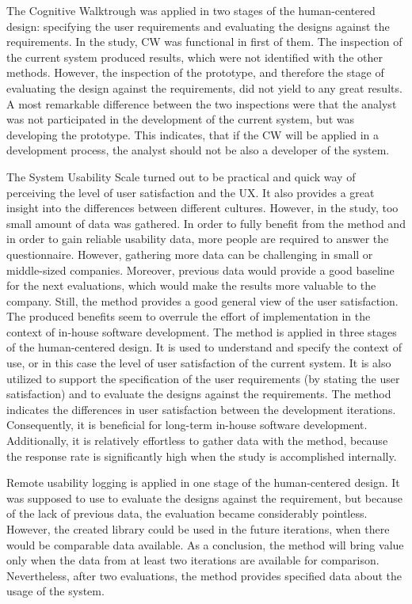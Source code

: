\documentclass[12pt,a4paper,oneside,pdftex]{report}
\begin{document}
The Cognitive Walktrough was applied in two stages of the human-centered design: specifying the user requirements and evaluating the designs against the requirements. In the study, CW was functional in first of them. The inspection of the current system produced results, which were not identified with the other methods. However, the inspection of the prototype, and therefore the stage of evaluating the design against the requirements, did not yield to any great results. A most remarkable difference between the two inspections were that the analyst was not participated in the development of the current system, but was developing the prototype. This indicates, that if the CW will be applied in a development process, the analyst should not be also a developer of the system.  

The System Usability Scale turned out to be practical and quick way of perceiving the level of user satisfaction and the UX. It also provides a great insight into the differences between different cultures. However, in the study, too small amount of data was gathered. In order to fully benefit from the method and in order to gain reliable usability data, more people are required to answer the questionnaire. However, gathering more data can be challenging in small or middle-sized companies. Moreover, previous data would provide a good baseline for the next evaluations, which would make the results more valuable to the company. Still, the method provides a good general view of the user satisfaction. The produced benefits seem to overrule the effort of implementation in the context of in-house software development. The method is applied in three stages of the human-centered design. It is used to understand and specify the context of use, or in this case the level of user satisfaction of the current system. It is also utilized to support the specification of the user requirements (by stating the user satisfaction) and to evaluate the designs against the requirements. The method indicates the differences in user satisfaction between the development iterations. Consequently, it is beneficial for long-term in-house software development. Additionally, it is relatively effortless to gather data with the method, because the response rate is significantly high when the study is accomplished internally.

Remote usability logging is applied in one stage of the human-centered design. It was supposed to use to evaluate the designs against the requirement, but because of the lack of previous data, the evaluation became considerably pointless. However, the created library could be used in the future iterations, when there would be comparable data available. As a conclusion, the method will bring value only when the data from at least two iterations are available for comparison. Nevertheless, after two evaluations, the method provides specified data about the usage of the system.
      
\end{document}
